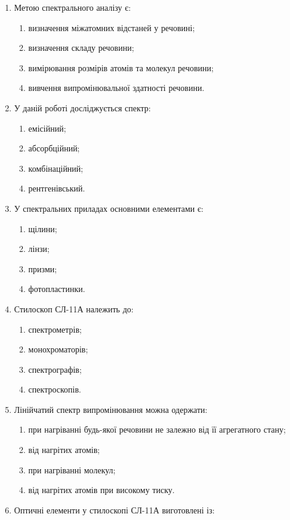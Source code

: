 \documentclass[twocolumn]{el-author}
\begin{document}
\begin{enumerate}
	\item Метою спектрального аналізу є:
	\begin{enumerate}
		\item визначення міжатомних відстаней у речовині;
		\item визначення складу речовини;
		\item вимірювання розмірів атомів та молекул речовини;
		\item вивчення випромінювальної здатності речовини.
	\end{enumerate}
	\item У даній роботі досліджується спектр:
	\begin{enumerate}
		\item емісійний;
		\item абсорбційний;
		\item комбінаційний;
		\item рентгенівський.
	\end{enumerate}
	\item У спектральних приладах основними елементами є:
	\begin{enumerate}
		\item щілини;
		\item лінзи;
		\item призми;
		\item фотопластинки.
	\end{enumerate}
	\item Стилоскоп СЛ-11А належить до:
	\begin{enumerate}
		\item спектрометрів;
		\item монохроматорів;
		\item спектрографів;
		\item спектроскопів.
	\end{enumerate}
	\item Лінійчатий спектр випромінювання можна одержати:
	\begin{enumerate}
		\item при нагріванні будь-якої речовини не залежно від її агрегатного стану;
		\item від нагрітих атомів;
		\item при нагріванні молекул;
		\item від нагрітих атомів при високому тиску.
	\end{enumerate}
	\item Оптичні елементи у стилоскопі СЛ-11А виготовлені із:

\end{enumerate}
\end{document}
